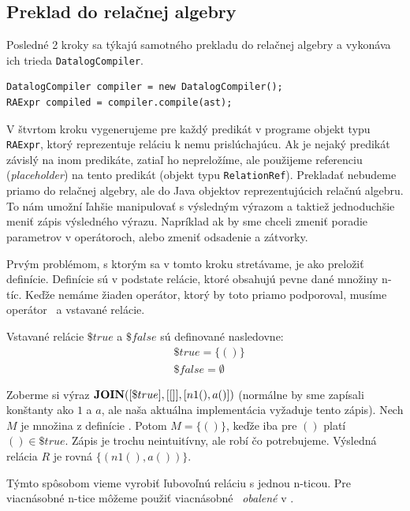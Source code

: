 \subsection{Preklad do relačnej algebry}
Posledné 2 kroky sa týkajú samotného prekladu do relačnej algebry a vykonáva ich trieda
\texttt{DatalogCompiler}.

\begin{lstlisting}
DatalogCompiler compiler = new DatalogCompiler();
RAExpr compiled = compiler.compile(ast);
\end{lstlisting}

V štvrtom kroku vygenerujeme pre každý predikát v programe objekt typu \texttt{RAExpr}, ktorý
reprezentuje reláciu k nemu prislúchajúcu. Ak je nejaký predikát závislý na inom predikáte, zatiaľ
ho nepreložíme, ale použijeme referenciu (\textit{placeholder}) na tento pre\-dikát (objekt typu
\texttt{RelationRef}). Prekladať nebudeme priamo do relačnej algebry, ale do Java objektov
reprezentujúcich relačnú algebru. To nám umožní ľahšie manipulovať s výsledným výrazom a taktiež
jednoduchšie meniť zápis výsledného výrazu. Napríklad ak by sme chceli zmeniť poradie parametrov v
operátoroch, alebo zmeniť odsadenie a zátvorky.

\vline

Prvým problémom, s ktorým sa v tomto kroku stretávame, je ako preložiť definície. Definície sú v
podstate relácie, ktoré obsahujú pevne dané množiny n-tíc. Keďže nemáme žiaden operátor, ktorý by
toto priamo podporoval, musíme  operátor \JOIN\ a vstavané relácie.

\begin{definition}
    Vstavané relácie $\$true$ a $\$false$ sú definované nasledovne:
    \begin{align*}
        &\$true = \{()\} \\
        &\$false = \emptyset
    \end{align*}
\end{definition}

Zoberme si výraz $\textbf{JOIN}([\$true], [[]], [n1(), a()])$ (normálne by sme zapísali konštanty ako $1$ a
$a$, ale naša aktuálna implementácia vyžaduje tento zápis). Nech $M$ je množina z definície \JOIN.
Potom $M = \{()\}$, keďže iba pre $()$ platí $() \in \$true$. Zápis je trochu neintuitívny, ale robí
čo potrebujeme. Výsledná relácia $R$ je rovná $\{(n1(), a())\}$.

Týmto spôsobom vieme vyrobiť ľubovoľnú reláciu s jednou
n-ticou. Pre viacnásobné n-tice môžeme použiť viacnásobné \JOIN\ \textit{obalené} v \UNION.

